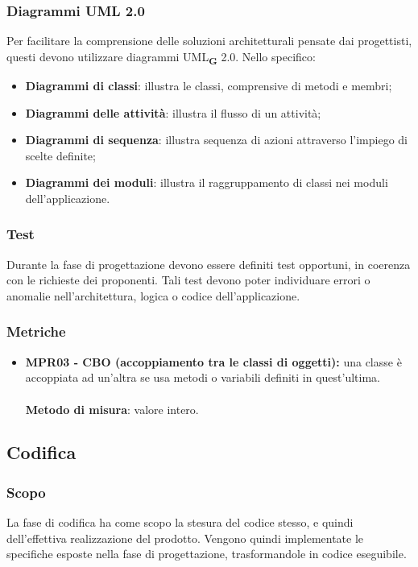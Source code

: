 \subsubsection{Diagrammi UML 2.0}
Per facilitare la comprensione delle soluzioni architetturali pensate dai progettisti, questi devono utilizzare diagrammi UML\textsubscript{\textbf{G}} 2.0.
Nello specifico:
\begin{itemize}
    \item \textbf{Diagrammi di classi}: illustra le classi, comprensive di metodi e membri;
    \item \textbf{Diagrammi delle attività}: illustra il flusso di un attività;
    \item \textbf{Diagrammi di sequenza}: illustra sequenza di azioni attraverso l'impiego di scelte definite;
    \item \textbf{Diagrammi dei moduli}: illustra il raggruppamento di classi nei moduli dell'applicazione.
\end{itemize}
\subsubsection{Test}
Durante la fase di progettazione devono essere definiti test opportuni, in coerenza con le richieste dei proponenti.
Tali test devono poter individuare errori o anomalie nell'architettura, logica o codice dell'applicazione.
\subsubsection{Metriche}
\begin{itemize}
    \item \textbf{MPR03 - CBO (accoppiamento tra le classi di oggetti):} una classe è accoppiata ad un'altra se usa metodi o variabili definiti in quest'ultima.\\
          \\\textbf{Metodo di misura}: valore intero.
\end{itemize}
\subsection{Codifica}
\subsubsection{Scopo}
La fase di codifica ha come scopo la stesura del codice stesso, e quindi dell'effettiva realizzazione del prodotto.
Vengono quindi implementate le specifiche esposte nella fase di progettazione, trasformandole in codice eseguibile.
